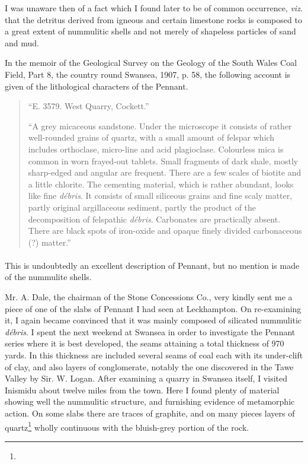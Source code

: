 \documentclass[a4paper, 12pt, oneside]{article}
\begin{document}
I was unaware then of a fact which I found later to be of common occurrence, \emph{viz.} that the detritus derived from igneous and certain limestone rocks is composed to a great extent of nummulitic shells and not merely of shapeless particles of sand and mud.

In the memoir of the Geological Survey on the Geology of the South Wales Coal Field, Part 8, the country round Swansea, 1907, p. 58, the following account is given of the lithological characters of the Pennant.

\begin{quote} 
``E. 3579. West Quarry, Cockett.''

``A grey micaceous sandstone. Under the microscope it consists of rather well-rounded grains of quartz, with a small amount of felspar which includes orthoclase, micro-line and acid plagioclase. Colourless mica is common in worn frayed-out tablets. Small fragments of dark shale, mostly sharp-edged and angular are frequent. There are a few scales of biotite and a little chlorite. The cementing material, which is rather abundant, looks like fine \emph{débris}. It consists of small siliceous grains and fine scaly matter, partly original argillaceous sediment, partly the product of the decomposition of felspathic \emph{débris}. Carbonates are practically absent. There are black spots of iron-oxide and opaque finely divided carbonaceous (?) matter.''
\end{quote}
\paragraph{}
This is undoubtedly an excellent description of Pennant, but no mention is made of the nummulite shells.

Mr. A. Dale, the chairman of the Stone Concessions Co., very kindly sent me a piece of one of the slabs of Pennant I had seen at Leckhampton. On re-examining it, I again became convinced that it was mainly composed of silicated nummulitic \emph{débris}. I spent the next weekend at Swansea in order to investigate the Pennant series where it is best developed, the seams attaining a total thickness of 970 yards. In this thickness are included several seams of coal each with its under-clift of clay, and also layers of conglomerate, notably the one discovered in the Tawe Valley by Sir. W. Logan. After examining a quarry in Swansea itself, I visited Inismidu about twelve miles from the town. Here I found plenty of material showing well the nummulitic structure, and furnishing evidence of metamorphic action. On some slabs there are traces of graphite, and on many pieces layers of quartz\footnote{} wholly continuous with the bluish-grey portion of the rock.
\end{document}
